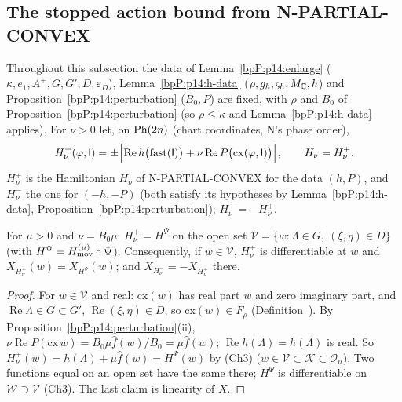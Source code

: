 \subsection{The stopped action bound from N-PARTIAL-CONVEX}\label{bpP:p14:sec-stopped}

Throughout this subsection the data of Lemma~\ref{bpP:p14:enlarge} ($\kappa,e_1,A^+,G,G',D,\varepsilon_D$), Lemma~\ref{bpP:p14:h-data} ($\rho,g_h,\varsigma_h,M_{\mathbb{C}},h$) and Proposition~\ref{bpP:p14:perturbation} ($B_0,P$) are fixed, with $\rho$ and $B_0$ of Proposition~\ref{bpP:p14:perturbation} (so $\rho\le\kappa$ and Lemma~\ref{bpP:p14:h-data} applies). For $\nu>0$ let, on $\mathrm{Ph}(2n)$ (chart coordinates, N's phase order),
\[H_\nu^{\pm}(\varphi,\mathsf I)=\pm\Bigl[\operatorname{Re}h\bigl(\mathrm{fast}(\mathsf I)\bigr)+\nu\operatorname{Re}P\bigl(\mathrm{cx}(\varphi,\mathsf I)\bigr)\Bigr],\qquad H_\nu=H_\nu^+ .\]
$H^+_\nu$ is the Hamiltonian $H_\nu$ of N-PARTIAL-CONVEX for the data $(h,P)$, and $H_\nu^-$ the one for $(-h,-P)$ (both satisfy its hypotheses by Lemma~\ref{bpP:p14:h-data}, Proposition~\ref{bpP:p14:perturbation}); $H_\nu^-=-H_\nu^+$.

\begin{lemma}\label{bpP:p14:hnu}
For $\mu>0$ and $\nu=B_0\mu$: $H_\nu^+=H^\Psi$ on the open set $\mathcal V=\{w:\Lambda\in G,\ (\xi,\eta)\in D\}$ (with $H^\Psi=H_{\rm mov}^{(\mu)}\circ\Psi$). Consequently, if $w\in\mathcal V$, $H^+_\nu$ is differentiable at $w$ and $X_{H^+_\nu}(w)=X_{H^\Psi}(w)$; and $X_{H^-_\nu}=-X_{H^+_\nu}$ there.
\end{lemma}
\begin{proof}
\label{stepP:p14:hn-eq} For $w\in\mathcal V$ and real: $\mathrm{cx}(w)$ has real part $w$ and zero imaginary part, and $\operatorname{Re}\Lambda\in G\subset G'$, $\operatorname{Re}(\xi,\eta)\in D$, so $\mathrm{cx}(w)\in F_\rho$ (Definition~). By Proposition~\ref{bpP:p14:perturbation}(ii), $\nu\operatorname{Re}P(\mathrm{cx}\,w)=B_0\mu\hat f(w)/B_0=\mu\hat f(w)$; $\operatorname{Re}h(\Lambda)=h(\Lambda)$ is real. So $H_\nu^+(w)=h(\Lambda)+\mu\hat f(w)=H^\Psi(w)$ by (Ch3) ($w\in\mathcal V\subset\mathcal K\subset\mathcal O_n$).
\label{stepP:p14:hn-field} Two functions equal on an open set have the same  there; $H^\Psi$ is differentiable on $\mathcal W\supset\mathcal V$ (Ch3). The last claim is linearity of $X$.
\end{proof}


